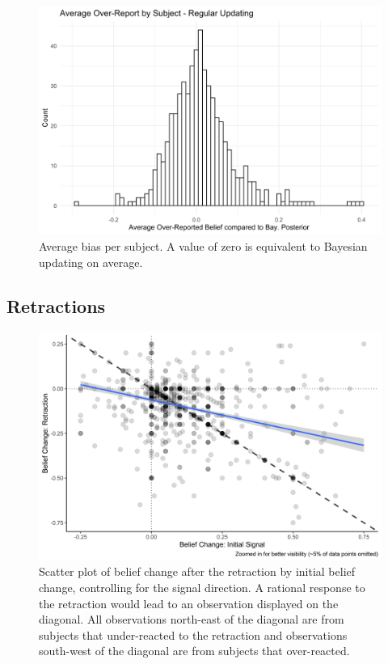 \documentclass{article}
\begin{document}
\vspace{1cm}

\begin{figure}[!ht]
    \centering
    \includegraphics[width=12cm]{Fig/02_fig_belief_distance_type_avg.jpg}
    \caption{Average bias per subject. A value of zero is equivalent to Bayesian updating on average.}
    \label{fig:regular_belief_diff_type}
\end{figure}




\newpage
\subsection{Retractions}

\begin{figure}[!htb]
    \centering
    \includegraphics[width = 12cm]{Fig/02_fig_retract_change_lm.jpg}
    \caption{Scatter plot of belief change after the retraction by initial belief change, controlling for the signal direction. A rational response to the retraction would lead to an observation displayed on the diagonal. All observations north-east of the diagonal are from subjects that under-reacted to the retraction and observations south-west of the diagonal are from subjects that over-reacted.}
    \label{fig:retract_change}
\end{figure}
\end{document}
